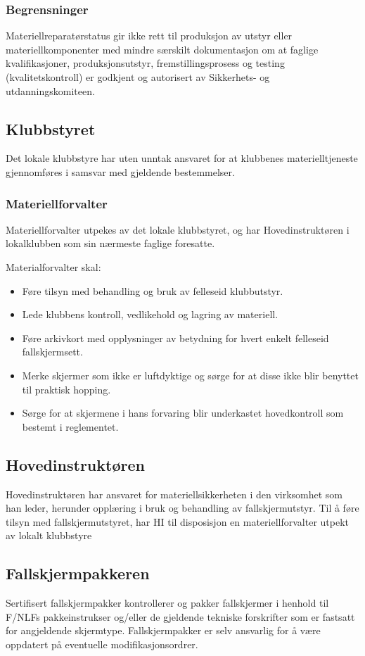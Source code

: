\subsubsection{Begrensninger}
Materiellreparatørstatus gir ikke rett til produksjon av utstyr eller materiellkomponenter med mindre særskilt dokumentasjon om at faglige kvalifikasjoner, produksjonsutstyr, fremstillingsprosess og testing (kvalitetskontroll) er godkjent og autorisert av Sikkerhets- og utdanningskomiteen.

\subsection{Klubbstyret}
Det lokale klubbstyre har uten unntak ansvaret for at klubbenes materielltjeneste gjennomføres i samsvar med gjeldende bestemmelser.

\subsubsection{Materiellforvalter}
Materiellforvalter utpekes av det lokale klubbstyret, og har Hovedinstruktøren i lokalklubben som sin nærmeste faglige foresatte.

Materialforvalter skal:
\begin{itemize}
	\item Føre tilsyn med behandling og bruk av felleseid klubbutstyr.
	\item Lede klubbens kontroll, vedlikehold og lagring av materiell.
	\item Føre arkivkort med opplysninger av betydning for hvert enkelt felleseid fallskjermsett.
	\item Merke skjermer som ikke er luftdyktige og sørge for at disse ikke blir benyttet til praktisk hopping.
	\item Sørge for at skjermene i hans forvaring blir underkastet hovedkontroll som bestemt i reglementet.
\end{itemize}

\subsection{Hovedinstruktøren}
Hovedinstruktøren har ansvaret for materiellsikkerheten i den virksomhet som han leder, herunder opplæring i bruk og behandling av fallskjermutstyr. Til å føre tilsyn med fallskjermutstyret, har HI til disposisjon en materiellforvalter utpekt av lokalt klubbstyre

\subsection{Fallskjermpakkeren}
Sertifisert fallskjermpakker kontrollerer og pakker fallskjermer i henhold til F/NLFs pakkeinstrukser og/eller de gjeldende tekniske forskrifter som er fastsatt for angjeldende skjermtype. Fallskjermpakker er selv ansvarlig for å være oppdatert på eventuelle modifikasjonsordrer.

